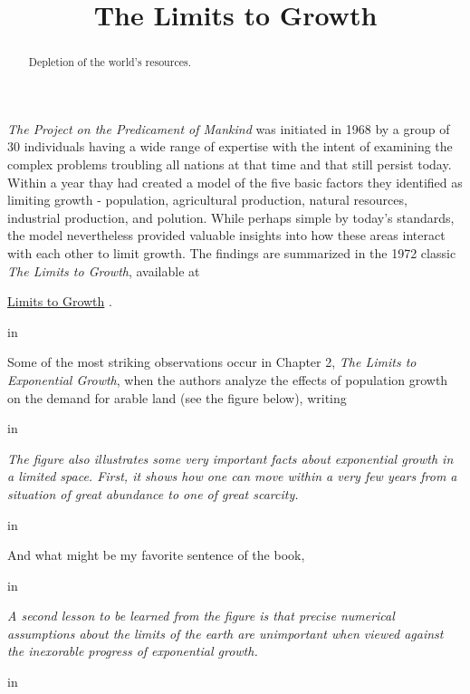 \documentclass{ximera}
\title{The Limits to Growth}
\newcommand{\pskip}{\vskip 0.1 in}
\begin{document}
\begin{abstract}
Depletion of the world's resources.
\end{abstract}
\maketitle


\emph{The Project on the Predicament of Mankind} was initiated in 1968 by a group of 30 individuals having a wide range of expertise with the intent of examining the complex problems troubling all nations at that time and that still persist today. Within a year thay had created a model of the five basic factors they identified as limiting growth  - population, agricultural production, natural resources, industrial production, and polution. While perhaps simple by today's standards, the model nevertheless provided valuable insights into how these areas interact with each other to limit growth. The findings are summarized in the 1972 classic \emph{The Limits to Growth}, available at

\href{https://www.library.dartmouth.edu/digital/digital-collections/limits-growth}{Limits to Growth} .

\pskip

Some of the most striking observations occur in Chapter 2, \emph{The Limits to Exponential Growth}, when the authors analyze the effects of population growth on the demand for arable land (see the figure below), writing 

\pskip

\emph{The figure also illustrates some very important facts about exponential growth in a limited space. First, it shows how one can move within a very few years from a situation of great abundance to one of great scarcity.}  

\pskip

And what might be my favorite sentence of the book, 

\pskip

\emph{A second lesson to be learned from the figure is that precise numerical assumptions about the limits of the earth are unimportant when viewed against the inexorable progress of exponential growth.}

\pskip

 
\end{document}
